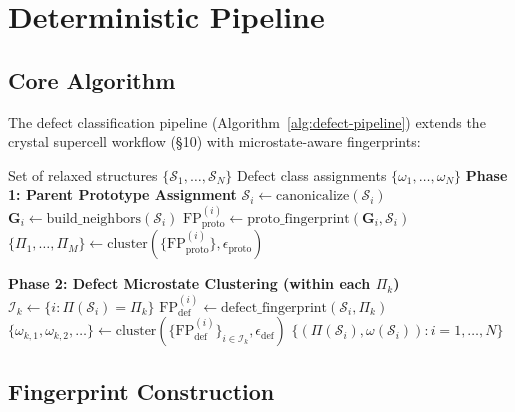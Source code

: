 \documentclass[11pt]{article}
\begin{document}
\section{Deterministic Pipeline}

\subsection{Core Algorithm}

The defect classification pipeline (Algorithm~\ref{alg:defect-pipeline}) extends
the crystal supercell workflow (\S10) with microstate-aware fingerprints:

\begin{algorithm}[H]
\caption{Defect Microstate Classification}
\label{alg:defect-pipeline}
\begin{algorithmic}[1]
\Require Set of relaxed structures $\{\mathcal{S}_1, \ldots, \mathcal{S}_N\}$
\Ensure Defect class assignments $\{\omega_1, \ldots, \omega_N\}$
\State \textbf{Phase 1: Parent Prototype Assignment}
  \State $\mathcal{S}_i \gets \mathrm{canonicalize}(\mathcal{S}_i)$
  \State $\mathbf{G}_i \gets \mathrm{build\_neighbors}(\mathcal{S}_i)$
  \State $\mathrm{FP}_{\mathrm{proto}}^{(i)} \gets
         \mathrm{proto\_fingerprint}(\mathbf{G}_i, \mathcal{S}_i)$
\EndFor
\State $\{\Pi_1, \ldots, \Pi_M\} \gets
       \mathrm{cluster}(\{\mathrm{FP}_{\mathrm{proto}}^{(i)}\}, \epsilon_{\mathrm{proto}})$

\State
\State \textbf{Phase 2: Defect Microstate Clustering (within each $\Pi_k$)}
  \State $\mathcal{I}_k \gets \{i : \Pi(\mathcal{S}_i) = \Pi_k\}$
    \State $\mathrm{FP}_{\mathrm{def}}^{(i)} \gets
           \mathrm{defect\_fingerprint}(\mathcal{S}_i, \Pi_k)$
  \EndFor
  \State $\{\omega_{k,1}, \omega_{k,2}, \ldots\} \gets
         \mathrm{cluster}(\{\mathrm{FP}_{\mathrm{def}}^{(i)}\}_{i \in \mathcal{I}_k},
         \epsilon_{\mathrm{def}})$
\EndFor
\State \Return $\{(\Pi(\mathcal{S}_i), \omega(\mathcal{S}_i)) : i = 1, \ldots, N\}$
\end{algorithmic}
\end{algorithm}

\subsection{Fingerprint Construction}
\end{document}
